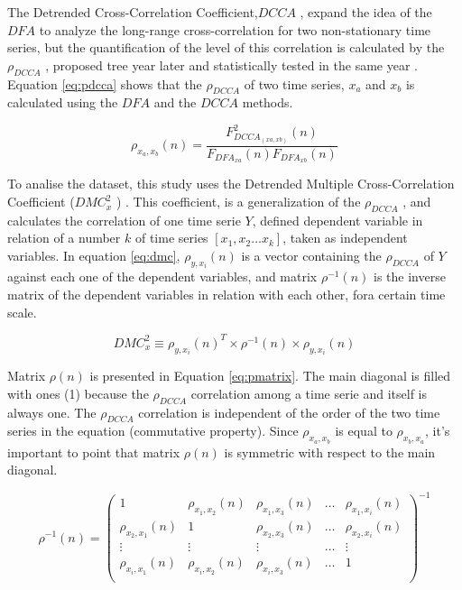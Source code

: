 \documentclass[10pt,letterpaper]{article}
\newcommand{\dmc}{\(DMC_x^2\) }
\newcommand{\pdcca}{\({\rho}_{DCCA}\) }
\begin{document}
The Detrended Cross-Correlation Coefficient,\(DCCA\) \cite{Podobnik2008}, expand the idea of the \(DFA\) to analyze the long-range cross-correlation for two non-stationary time series, but the quantification of the level of this correlation is calculated by the \pdcca, proposed tree year later \cite{Zebende2011} and statistically tested in the same year \cite{PhysRevE.84.066118}. Equation \ref{eq:pdcca} shows that the \pdcca of two time series, \(x_{a}\) and \(x_{b}\) is calculated using the \(DFA\) and the \(DCCA\) methods. 

\begin{equation}\label{eq:pdcca}
  {\rho}_{x_{a},x_{b}}(n) = \frac{F_{DCCA_{(xa,xb)}}^{2}(n)}{F_{DFA_{xa}}(n) F_{DFA_{xb}}(n)}
  \end{equation}

To analise the dataset, this study uses the Detrended Multiple Cross-Correlation Coefficient (\dmc) \cite{Zebende2018}. This coefficient, is a generalization of the \pdcca, and calculates the correlation of one time serie \(Y\), defined dependent variable in relation of a number \(k\) of time series \([x_{1}, x_{2} \dots x_{k}]\), taken as independent variables. In equation \ref{eq:dmc}, \(\rho_{y,x_{i}}(n)\) is a vector containing the \pdcca of \(Y\) against each one of the dependent variables, and matrix \(\rho^{-1}(n)\) is the inverse matrix of the dependent variables in relation with each other, fora certain time scale.

\begin{equation}\label{eq:dmc}
  {DMC}_{x}^{2}  \equiv \rho_{y,x_{i}}(n)^{T} \times \rho^{-1}(n) \times \rho_{y,x_{i}}(n)
\end{equation}

Matrix \(\rho(n)\) is presented in Equation \ref{eq:pmatrix}. The main diagonal is filled with ones (1) because the \pdcca correlation among a time serie and itself is always one. The \pdcca correlation is independent of the order of the two time series in the equation (commutative property). Since \(\rho_{x_{a},x_{b}}\) is equal to \(\rho_{x_{b},x_{a}}\), it's important to point that matrix \(\rho(n)\) is symmetric with respect to the main diagonal. 

\begin{equation}\label{eq:pmatrix}
  \rho^{-1}(n) = \left(\begin{matrix} 
    1 & \rho_{x_{1},x_{2}}(n)                       &  \rho_{x_{1},x_{3}}(n) & \dots  &  \rho_{x_{1},x_{i}}(n) \\
    \rho_{x_{2},x_{1}}(n) & 1                       &  \rho_{x_{2},x_{3}}(n) & \dots  &  \rho_{x_{2},x_{i}}(n) \\
    \vdots                &  \vdots                 &  \vdots                & \dots  & \vdots \\
    \rho_{x_{i},x_{1}}(n) & \rho_{x_{i},x_{2}}(n)   &  \rho_{x_{i},x_{3}}(n) & \dots  &  1 \\
    \end{matrix}\right)^{-1}
\end{equation}
\end{document}

